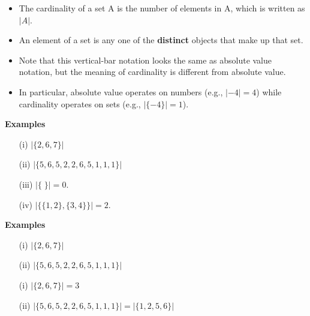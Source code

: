 
\begin{itemize}
\item The cardinality of a set A is the number of elements in A, which is written as $|A|$.
\item An element of a set is any one of the \textbf{distinct} objects that make up that set.

\end{itemize}


\begin{itemize}

\item Note that this vertical-bar notation looks the same as absolute value notation, 
but the meaning of cardinality is different from absolute value.

\item In particular, absolute value operates on numbers (e.g., $|-4| = 4$) 
while cardinality operates on sets (e.g., $|\{-4\}| = 1$).
\end{itemize}


\textbf{Examples}
\begin{itemize}
\item[(i)] $|\{2,6,7\}|$
\item[(ii)] $|\{5,6,5,2,2,6,5,1,1,1\}|$
\item[(iii)] $|\{ \;\}| = 0$. %
\item[(iv)] $|\{\{1,2\},\{3,4\}\}| = 2$. 
\end{itemize}



\textbf{Examples}
\begin{itemize}
\item[(i)] $|\{2,6,7\}| $
\vspace{2cm}
\item[(ii)] $|\{5,6,5,2,2,6,5,1,1,1\}| $

\item[(i)] $|\{2,6,7\}| = 3 $
\vspace{2cm}
\item[(ii)] $|\{5,6,5,2,2,6,5,1,1,1\}| = |\{1,2,5,6\}| $
\end{itemize}


